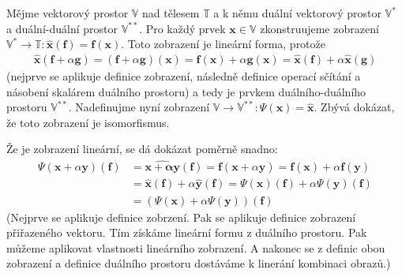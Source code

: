 \documentclass[a5paper,12pt]{amsbook}
\theoremstyle{definition}
\newcommand{\myvec}[1]{\bm{#1}}
\newcommand{\myspace}[1]{\mathbb{#1}}
\newcommand{\mydual}[1]{\myspace{#1^{*}}}
\newcommand{\mydouble}[1]{\myspace{#1^{**}}}
\newcommand{\mycocovec}[1]{\mathbf{\widehat{#1}}}
\begin{document}
Mějme vektorový prostor $\myspace{V}$ nad tělesem $\myspace{T}$ a k němu duální vektorový prostor $\mydual{V}$
a duální-duální prostor $\mydouble{V}$. Pro každý prvek $\myvec{x}\in\myspace{V}$ zkonstruujeme zobrazení
$\mydual{V}\rightarrow\myspace{T}: \mycocovec{x}(\myvec{f}) = \myvec{f}(\myvec{x})$.
Toto zobrazení je lineární forma, protože
\begin{equation*}
\begin{split}
\mycocovec{x}(\myvec{f} + \alpha\myvec{g}) = (\myvec{f} + \alpha\myvec{g})(\myvec{x}) 
     = \myvec{f}(\myvec{x}) + \alpha\myvec{g}(\myvec{x})
     = \mycocovec{x}(\myvec{f}) + \alpha\mycocovec{x}(\myvec{g})
\end{split}
\end{equation*}
(nejprve se aplikuje definice zobrazení, následně definice operací sčítání a násobení skalárem duálního
prostoru) a tedy je prvkem duálního-duálního prostoru $\mydouble{V}$. Nadefinujme nyní zobrazení
$\myspace{V}\rightarrow\mydouble{V}: \Psi(\myvec{x}) = \mycocovec{x}$. Zbývá
dokázat, že toto zobrazení je isomorfismus.

\medskip\noindent
Že je zobrazení lineární, se dá dokázat poměrně snadno:
\begin{equation*}
\begin{split}
\Psi(\myvec{x} + \alpha\myvec{y})(\myvec{f}) &= \mycocovec{\myvec{x} + \alpha\myvec{y}}(\myvec{f})
     = \myvec{f}(\myvec{x} + \alpha\myvec{y}) = \myvec{f}(\myvec{x}) + \alpha\myvec{f}(\myvec{y}) \\
     &= \mycocovec{x}(\myvec{f}) + \alpha\mycocovec{y}(\myvec{f})
     = \Psi(\myvec{x})(\myvec{f}) + \alpha\Psi(\myvec{y})(\myvec{f}) \\
     &= (\Psi(\myvec{x}) + \alpha\Psi(\myvec{y}))(\myvec{f})
\end{split}
\end{equation*}
(Nejprve se aplikuje definice zobrzení. Pak se aplikuje definice zobrazení přiřazeného vektoru.
Tím získáme lineární formu z duálního prostoru. Pak můžeme aplikovat vlastnosti lineárního
zobrazení. A nakonec se z definic obou zobrazení a definice duálního prostoru dostáváme k linerání
kombinaci obrazů.)
\end{document}
